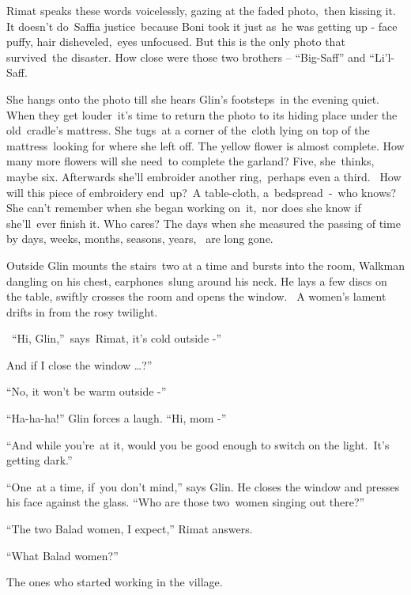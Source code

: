 \documentclass[twoside,11pt]{book}
\begin{document}
Rimat speaks these words voicelessly, gazing at the faded photo,\ then kissing it.
It{ doesn't
do\ Saffia} {justice\ because Boni took it }just
as\ he was getting up - face puffy, hair
disheveled,{\ }{eyes
unfocused. But this is the only photo that survived\ }the disaster{.
How close were those two brothers {}-- }{}``Big-Saff{}'' and {}``Li{}'l{}-Saff{\textquotedbl}. 

S{he hangs onto the photo till she hears Glin's footsteps\ in the
evening quiet. When }they get louder\ {it's time to return the photo
to its hiding place under the old\ cradle's mattress. She tugs\ at a corner of
the}{\ }cloth lying on top of the
mattress{\ looking for where she left off. The yellow flower is almost
complete. How many more flowers will she need}\ {to complete the
garland? Five, she\ }thinks{, maybe six. Afterwards she'll embroider
another }ring,\ p{erhaps even a third.~
}How{ will this piece of embroidery
end\ }up?{\ }A{
table{}-cloth,} a\ {bedspread\ {}-\ who knows? She can't remember when
she began working on\ }it,\ nor does she know if she'll\ {ever finish
it. Who cares? }The days when she measured the passing of time by days, weeks, months, seasons, years, \ are long
gone.\ 

{Outside Glin }mounts the
stairs\ {two at a time and bursts into the room, Walkman dangling on
his chest, earphones~}slung{ around his neck. He lays a few discs on
the table, swiftly crosses the room and opens the window.~ A women's lament drifts in from the rosy twilight.}

{\ {}``}Hi,{
Glin,''\ says\ Rimat, {\textquotedbl}it's cold outside -{}''}

{\textquotedbl}And if I{ close the window {\dots}?{}''}

{{}``No, it won't be warm outside -{}''}

{{}``Ha-ha-ha!'' Glin }forces a
laugh{. ``Hi, mom -{}''\ }

{{}``And while you're\ at it, }would you be good enough to switch on
the light.\ {It's getting dark.{}''}

{{}``One~at a time, if~you }don't
mind{,'' says Glin. He closes the window and presses his face against
the glass}.{ ``Who are those
}two{\ }{women singing out
there?''}

{{}``The two Balad women, I
}expect{,'' Rimat answers.}

{{}``What Balad women?''}

{\textquotedbl}The ones who started working{ in the
village.{\textquotedbl}\ \ \ \ \ \ \ \ }
\end{document}
